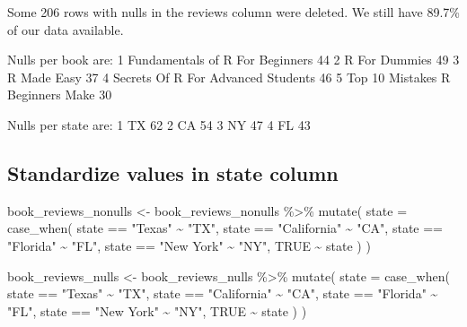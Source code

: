 \documentclass[
]{article}
\newenvironment{Shaded}{\begin{snugshade}}{\end{snugshade}}
\newcommand{\AttributeTok}[1]{\textcolor[rgb]{0.77,0.63,0.00}{#1}}
\newcommand{\ConstantTok}[1]{\textcolor[rgb]{0.00,0.00,0.00}{#1}}
\newcommand{\FunctionTok}[1]{\textcolor[rgb]{0.00,0.00,0.00}{#1}}
\newcommand{\NormalTok}[1]{#1}
\newcommand{\OtherTok}[1]{\textcolor[rgb]{0.56,0.35,0.01}{#1}}
\newcommand{\SpecialCharTok}[1]{\textcolor[rgb]{0.00,0.00,0.00}{#1}}
\newcommand{\StringTok}[1]{\textcolor[rgb]{0.31,0.60,0.02}{#1}}
\begin{document}
Some 206 rows with nulls in the reviews column were deleted. We still
have 89.7\% of our data available.

Nulls per book are: 1 Fundamentals of R For Beginners 44 2 R For Dummies
49 3 R Made Easy 37 4 Secrets Of R For Advanced Students 46 5 Top 10
Mistakes R Beginners Make 30

Nulls per state are: 1 TX 62 2 CA 54 3 NY 47 4 FL 43

\hypertarget{standardize-values-in-state-column}{%
\subsection{Standardize values in state
column}\label{standardize-values-in-state-column}}

\begin{Shaded}
\begin{Highlighting}[]
\NormalTok{book\_reviews\_nonulls }\OtherTok{\textless{}{-}}\NormalTok{ book\_reviews\_nonulls }\SpecialCharTok{\%\textgreater{}\%}
  \FunctionTok{mutate}\NormalTok{(}
    \AttributeTok{state =} \FunctionTok{case\_when}\NormalTok{(}
\NormalTok{      state }\SpecialCharTok{==} \StringTok{"Texas"} \SpecialCharTok{\textasciitilde{}} \StringTok{"TX"}\NormalTok{,}
\NormalTok{      state }\SpecialCharTok{==} \StringTok{"California"} \SpecialCharTok{\textasciitilde{}} \StringTok{"CA"}\NormalTok{,}
\NormalTok{      state }\SpecialCharTok{==} \StringTok{"Florida"} \SpecialCharTok{\textasciitilde{}} \StringTok{"FL"}\NormalTok{,}
\NormalTok{      state }\SpecialCharTok{==} \StringTok{"New York"} \SpecialCharTok{\textasciitilde{}} \StringTok{"NY"}\NormalTok{,}
      \ConstantTok{TRUE} \SpecialCharTok{\textasciitilde{}}\NormalTok{ state}
\NormalTok{    )}
\NormalTok{  )}

\NormalTok{book\_reviews\_nulls }\OtherTok{\textless{}{-}}\NormalTok{ book\_reviews\_nulls }\SpecialCharTok{\%\textgreater{}\%}
  \FunctionTok{mutate}\NormalTok{(}
    \AttributeTok{state =} \FunctionTok{case\_when}\NormalTok{(}
\NormalTok{      state }\SpecialCharTok{==} \StringTok{"Texas"} \SpecialCharTok{\textasciitilde{}} \StringTok{"TX"}\NormalTok{,}
\NormalTok{      state }\SpecialCharTok{==} \StringTok{"California"} \SpecialCharTok{\textasciitilde{}} \StringTok{"CA"}\NormalTok{,}
\NormalTok{      state }\SpecialCharTok{==} \StringTok{"Florida"} \SpecialCharTok{\textasciitilde{}} \StringTok{"FL"}\NormalTok{,}
\NormalTok{      state }\SpecialCharTok{==} \StringTok{"New York"} \SpecialCharTok{\textasciitilde{}} \StringTok{"NY"}\NormalTok{,}
      \ConstantTok{TRUE} \SpecialCharTok{\textasciitilde{}}\NormalTok{ state}
\NormalTok{    )}
\NormalTok{  )}
\end{Highlighting}
\end{Shaded}
\end{document}
